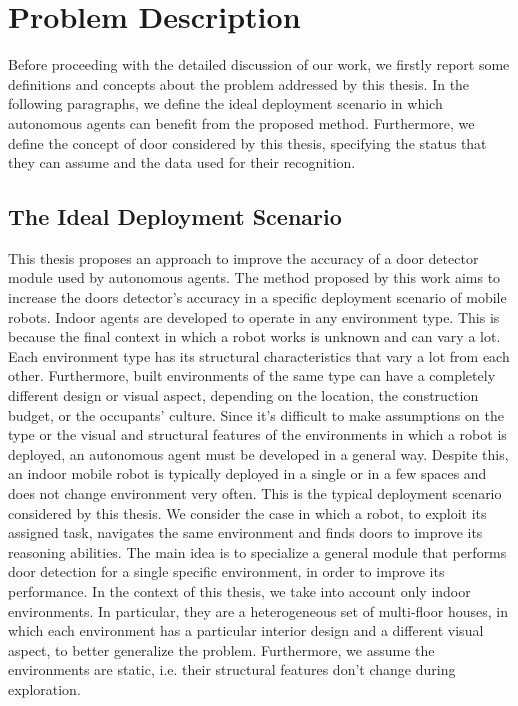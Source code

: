 \section{Problem Description}

Before proceeding with the detailed discussion of our work, we firstly report some definitions and concepts about the problem addressed by this thesis. In the following paragraphs, we define the ideal deployment scenario in which autonomous agents can benefit from the proposed method. Furthermore, we define the concept of door considered by this thesis, specifying the status that they can assume and the data used for their recognition.

\subsection{The Ideal Deployment Scenario}
\label{sec:deploymentscenario}
This thesis proposes an approach to improve the accuracy of a door detector module used by autonomous agents. The method proposed by this work aims to increase the doors detector's accuracy in a specific deployment scenario of mobile robots. Indoor agents are developed to operate in any environment type. This is because the final context in which a robot works is unknown and can vary a lot. Each environment type has its structural characteristics that vary a lot from each other. Furthermore, built environments of the same type can have a completely different design or visual aspect, depending on the location, the construction budget, or the occupants' culture. Since it's difficult to make assumptions on the type or the visual and structural features of the environments in which a robot is deployed, an autonomous agent must be developed in a general way. Despite this, an indoor mobile robot is typically deployed in a single or in a few spaces and does not change environment very often. This is the typical deployment scenario considered by this thesis. We consider the case in which a robot, to exploit its assigned task, navigates the same environment and finds doors to improve its reasoning abilities. The main idea is to specialize a general module that performs door detection for a single specific environment, in order to improve its performance. In the context of this thesis, we take into account only indoor environments. In particular, they are a heterogeneous set of multi-floor houses, in which each environment has a particular interior design and a different visual aspect, to better generalize the problem. Furthermore, we assume the environments are static, i.e. their structural features don't change during exploration.

